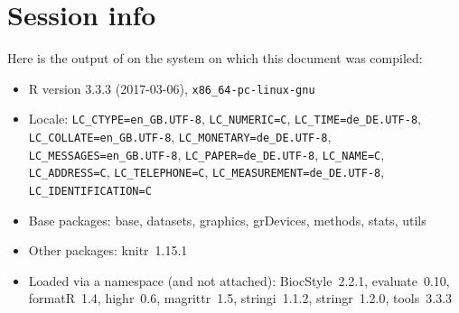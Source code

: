 \documentclass{article}\usepackage[]{graphicx}\usepackage[usenames,dvipsnames]{color}
\begin{document}
\section{Session info}

Here is the output of  on the system on which
this document was compiled:
\begin{itemize}\raggedright
  \item R version 3.3.3 (2017-03-06), \verb|x86_64-pc-linux-gnu|
  \item Locale: \verb|LC_CTYPE=en_GB.UTF-8|, \verb|LC_NUMERIC=C|, \verb|LC_TIME=de_DE.UTF-8|, \verb|LC_COLLATE=en_GB.UTF-8|, \verb|LC_MONETARY=de_DE.UTF-8|, \verb|LC_MESSAGES=en_GB.UTF-8|, \verb|LC_PAPER=de_DE.UTF-8|, \verb|LC_NAME=C|, \verb|LC_ADDRESS=C|, \verb|LC_TELEPHONE=C|, \verb|LC_MEASUREMENT=de_DE.UTF-8|, \verb|LC_IDENTIFICATION=C|
  \item Base packages: base, datasets, graphics,
    grDevices, methods, stats, utils
  \item Other packages: knitr~1.15.1
  \item Loaded via a namespace (and not attached):
    BiocStyle~2.2.1, evaluate~0.10, formatR~1.4,
    highr~0.6, magrittr~1.5, stringi~1.1.2,
    stringr~1.2.0, tools~3.3.3
\end{itemize}



\end{document}
